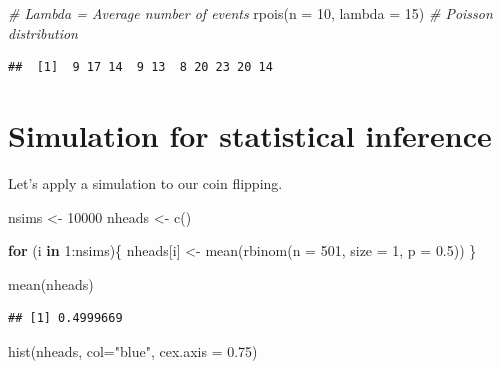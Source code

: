\documentclass[
]{book}
\newenvironment{Shaded}{\begin{snugshade}}{\end{snugshade}}
\newcommand{\AttributeTok}[1]{\textcolor[rgb]{0.77,0.63,0.00}{#1}}
\newcommand{\CommentTok}[1]{\textcolor[rgb]{0.56,0.35,0.01}{\textit{#1}}}
\newcommand{\ControlFlowTok}[1]{\textcolor[rgb]{0.13,0.29,0.53}{\textbf{#1}}}
\newcommand{\DecValTok}[1]{\textcolor[rgb]{0.00,0.00,0.81}{#1}}
\newcommand{\FloatTok}[1]{\textcolor[rgb]{0.00,0.00,0.81}{#1}}
\newcommand{\FunctionTok}[1]{\textcolor[rgb]{0.00,0.00,0.00}{#1}}
\newcommand{\NormalTok}[1]{#1}
\newcommand{\OtherTok}[1]{\textcolor[rgb]{0.56,0.35,0.01}{#1}}
\newcommand{\SpecialCharTok}[1]{\textcolor[rgb]{0.00,0.00,0.00}{#1}}
\newcommand{\StringTok}[1]{\textcolor[rgb]{0.31,0.60,0.02}{#1}}
\begin{document}
\begin{Shaded}
\begin{Highlighting}[]
\CommentTok{\# Lambda = Average number of events}
\FunctionTok{rpois}\NormalTok{(}\AttributeTok{n =} \DecValTok{10}\NormalTok{, }\AttributeTok{lambda =} \DecValTok{15}\NormalTok{) }\CommentTok{\# Poisson distribution}
\end{Highlighting}
\end{Shaded}

\begin{verbatim}
##  [1]  9 17 14  9 13  8 20 23 20 14
\end{verbatim}

\hypertarget{simulation-for-statistical-inference}{%
\section{Simulation for statistical inference}\label{simulation-for-statistical-inference}}

Let's apply a simulation to our coin flipping.

\begin{Shaded}
\begin{Highlighting}[]
\NormalTok{nsims }\OtherTok{\textless{}{-}} \DecValTok{10000}
\NormalTok{nheads }\OtherTok{\textless{}{-}} \FunctionTok{c}\NormalTok{() }

\ControlFlowTok{for}\NormalTok{ (i }\ControlFlowTok{in} \DecValTok{1}\SpecialCharTok{:}\NormalTok{nsims)\{}
\NormalTok{  nheads[i] }\OtherTok{\textless{}{-}} \FunctionTok{mean}\NormalTok{(}\FunctionTok{rbinom}\NormalTok{(}\AttributeTok{n =} \DecValTok{501}\NormalTok{, }\AttributeTok{size =} \DecValTok{1}\NormalTok{, }\AttributeTok{p =} \FloatTok{0.5}\NormalTok{))}
\NormalTok{\}}

\FunctionTok{mean}\NormalTok{(nheads)}
\end{Highlighting}
\end{Shaded}

\begin{verbatim}
## [1] 0.4999669
\end{verbatim}

\begin{Shaded}
\begin{Highlighting}[]
\FunctionTok{hist}\NormalTok{(nheads, }\AttributeTok{col=}\StringTok{"blue"}\NormalTok{, }\AttributeTok{cex.axis =} \FloatTok{0.75}\NormalTok{)}
\end{Highlighting}
\end{Shaded}
\end{document}
